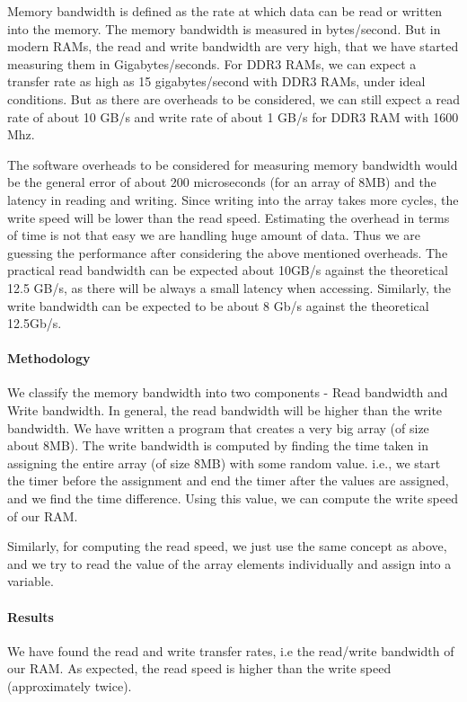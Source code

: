 \documentclass[conference]{IEEEtran}
\begin{document}
Memory bandwidth is defined as the rate at which data can be read or written into the memory. The memory bandwidth is measured in bytes/second. But in modern RAMs, the read and write bandwidth are very high, that we have started measuring them in Gigabytes/seconds. For DDR3 RAMs, we can expect a transfer rate as high as 15 gigabytes/second with DDR3 RAMs, under ideal conditions. But as there are overheads to be considered, we can still expect a read rate of about 10 GB/s and write rate of about 1 GB/s for DDR3 RAM with 1600 Mhz.
\par The software overheads to be considered for measuring memory bandwidth would be the general error of about 200 microseconds (for an array of 8MB) and the latency in reading and writing. Since writing into the array takes more cycles, the write speed will be lower than the read speed. Estimating the overhead in terms of time is not that easy we are handling huge amount of data. Thus we are guessing the performance after considering the above mentioned overheads. The practical read bandwidth can be expected about 10GB/s against the theoretical 12.5 GB/s, as there will be always a small latency when accessing. Similarly, the write bandwidth can be expected to be about 8 Gb/s against the theoretical 12.5Gb/s.



\paragraph{Methodology}

We classify the memory bandwidth into two components - Read bandwidth and Write bandwidth. In general, the read bandwidth will be higher than the write bandwidth. We have written a program that creates a very big array (of size about 8MB). The write bandwidth is computed by finding the time taken in assigning the entire array (of size 8MB) with some random value. i.e., we start the timer before the assignment and end the timer after the values are assigned, and we find the time difference. Using this value, we can compute the write speed of our RAM. 
\par Similarly, for computing the read speed, we just use the same concept as above, and we try to read the value of the array elements individually and assign into a variable.



\paragraph{Results}
We have found the read and write transfer rates, i.e the read/write bandwidth of our RAM. As expected, the read speed is higher than the write speed (approximately twice).
\end{document}
